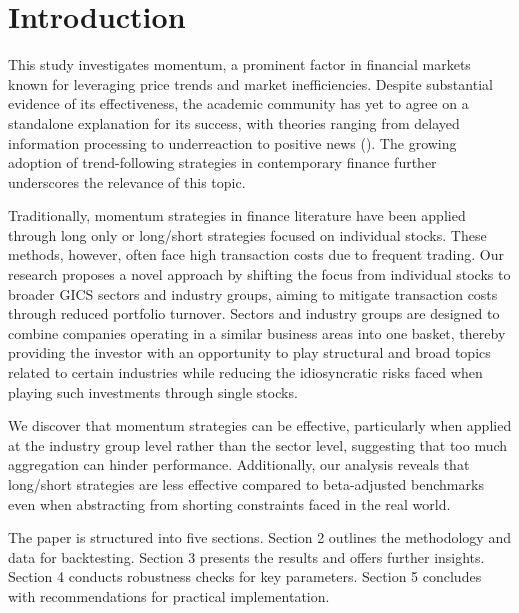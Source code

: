 \documentclass[a4paper,12pt,twoside]{article}
\begin{document}
    \setcounter{page}{1}
	\tableofcontents
	
	\clearpage
	\listoffigures
	
	\listoftables
	
	\clearpage
    \setcounter{page}{1}
    \setlength{\parindent}{0pt}
    \setlength{\parskip}{8pt}


\section{Introduction}
This study investigates momentum, a prominent factor in financial markets known for leveraging price trends and market inefficiencies. Despite substantial evidence of its effectiveness, the academic community has yet to agree on a standalone explanation for its success, with theories ranging from delayed information processing to underreaction to positive news (\cite{hong2000bad}). The growing adoption of trend-following strategies in contemporary finance further underscores the relevance of this topic.

Traditionally, momentum strategies in finance literature have been applied through long only or long/short strategies focused on individual stocks. These methods, however, often face high transaction costs due to frequent trading. Our research proposes a novel approach by shifting the focus from individual stocks to broader GICS sectors and industry groups, aiming to mitigate transaction costs through reduced portfolio turnover. Sectors and industry groups are designed to combine companies operating in a similar business areas into one basket, thereby providing the investor with an opportunity to play structural and broad topics related to certain industries while reducing the idiosyncratic risks faced when playing such investments through single stocks. 

We discover that momentum strategies can be effective, particularly when applied at the industry group level rather than the sector level, suggesting that too much aggregation can hinder performance. Additionally, our analysis reveals that long/short strategies are less effective compared to beta-adjusted benchmarks even when abstracting from shorting constraints faced in the real world.

The paper is structured into five sections. Section 2 outlines the methodology and data for backtesting. Section 3 presents the results and offers further insights. Section 4 conducts robustness checks for key parameters. Section 5 concludes with recommendations for practical implementation.
\end{document}

